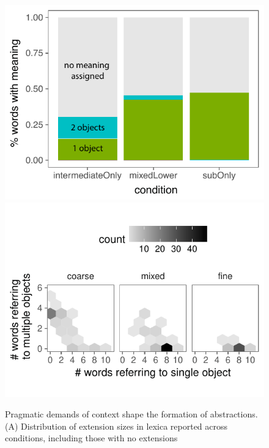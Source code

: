 \documentclass[10pt,letterpaper]{article}
\begin{document}
\begin{figure}[t]
\begin{center}
{\includegraphics[scale=0.7]{lexiconContent_edited.pdf}}
{\includegraphics[scale=0.7]{fullLexiconReport.pdf}}
{\caption{{Pragmatic demands of context shape the formation of abstractions. (A) Distribution of extension sizes in lexica reported across conditions, including those with no extensions  
}}}
\end{center}
\end{figure}
\end{document}
